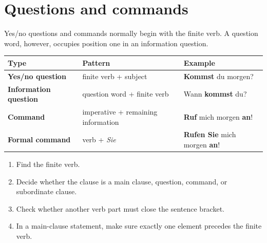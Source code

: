 \section{Questions and commands}

Yes/no questions and commands normally begin with the finite verb. A question
word, however, occupies position one in an information question.

\begin{center}
\small
{}
\begin{tabularx}{\textwidth}{@{}>{\bfseries}l l X@{}}
\toprule
Type & Pattern & Example \\
\midrule
Yes/no question & finite verb + subject & \textbf{Kommst} du morgen? \\
Information question & question word + finite verb & Wann \textbf{kommst} du? \\
Command & imperative + remaining information & \textbf{Ruf} mich morgen \textbf{an}! \\
Formal command & verb + \textit{Sie} & \textbf{Rufen Sie} mich morgen \textbf{an}! \\
\bottomrule
\end{tabularx}
\end{center}

\begin{tcolorbox}[
  colback=referenceBlueBg,
  colframe=genderMasculine,
  title={Quick verb-position check},
  fonttitle=\bfseries
]
\begin{enumerate}[leftmargin=*,nosep]
  \item Find the finite verb.
  \item Decide whether the clause is a main clause, question, command, or
        subordinate clause.
  \item Check whether another verb part must close the sentence bracket.
  \item In a main-clause statement, make sure exactly one element precedes the
        finite verb.
\end{enumerate}
\end{tcolorbox}

